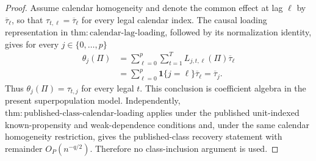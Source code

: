 \documentclass{article}
\begin{document}
\begin{proof}
Assume calendar homogeneity and denote the common effect at lag \(\ell\) by \(\overline\tau_{\ell}\), so that \(\tau_{t,\ell}=\overline\tau_{\ell}\) for every legal calendar index.  The causal loading representation in \(\mathrm{thm{:}calendar\text{-}lag\text{-}loading}\), followed by its normalization identity, gives for every \(j\in\{0,\ldots,p\}\)
\[
\begin{aligned}
 \theta_j(\Pi)
 &=\sum_{\ell=0}^{p}\sum_{t=1}^{T}
   L_{j,t,\ell}(\Pi)\overline\tau_{\ell}\\
 &=\sum_{\ell=0}^{p}\mathbf 1\{j=\ell\}\overline\tau_{\ell}
 =\overline\tau_j.
\end{aligned}
\]
Thus \(\theta_j(\Pi)=\tau_{t,j}\) for every legal \(t\).  This conclusion is coefficient algebra in the present superpopulation model.  Independently, \(\mathrm{thm{:}published\text{-}class\text{-}calendar\text{-}loading}\) applies under the published unit-indexed known-propensity and weak-dependence conditions and, under the same calendar homogeneity restriction, gives the published-class recovery statement with remainder \(O_P(n^{-q/2})\).  Therefore no class-inclusion argument is used.


\end{proof}
\end{document}
